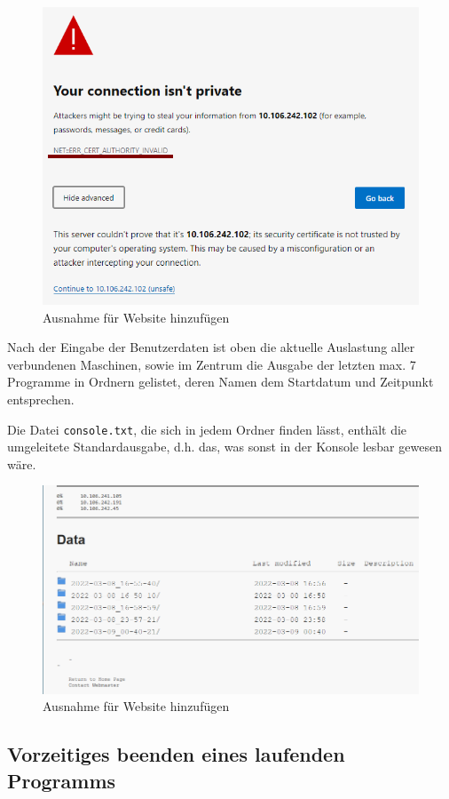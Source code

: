 \documentclass[11pt, a4paper]{article}
\begin{document}
\begin{figure}[h]
    \centering
    \includegraphics[width=0.7\linewidth]{./pics/2022-03-09_01-03_1.png}
    \caption{Ausnahme für Website hinzufügen}
    \label{fig:web-1}
\end{figure}

Nach der Eingabe der Benutzerdaten ist oben die aktuelle Auslastung aller verbundenen Maschinen, sowie im Zentrum die Ausgabe der letzten max. 7 Programme in Ordnern gelistet, deren Namen dem Startdatum und Zeitpunkt entsprechen.

Die Datei \texttt{console.txt}, die sich in jedem Ordner finden lässt, enthält die umgeleitete Standardausgabe, d.h. das, was sonst in der Konsole lesbar gewesen wäre.

\begin{figure}[h]
    \centering
    \includegraphics[width=0.7\linewidth]{./pics/2022-03-09_01-18.png}
    \caption{Ausnahme für Website hinzufügen}
    \label{fig:web-1}
\end{figure}


\subsection{Vorzeitiges beenden eines laufenden Programms}
\end{document}
